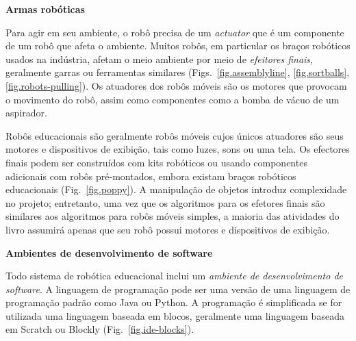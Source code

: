 
\smallskip

\noindent\textbf{Armas robóticas}

Para agir em seu ambiente, o robô precisa de um \emph{actuator} que é um componente de um robô que afeta o ambiente. Muitos robôs, em particular os braços robóticos usados na indústria, afetam o meio ambiente por meio de \emph{efeitores finais}, geralmente garras ou ferramentas similares (Figs.~\ref{fig.assemblyline}, \ref{fig.sortballs}, \ref{fig.robots-pulling}). Os atuadores dos robôs móveis são os motores que provocam o movimento do robô, assim como componentes como a bomba de vácuo de um aspirador.

Robôs educacionais são geralmente robôs móveis cujos únicos atuadores são seus motores e dispositivos de exibição, tais como luzes, sons ou uma tela. Os efectores finais podem ser construídos com kits robóticos ou usando componentes adicionais com robôs pré-montados, embora existam braços robóticos educacionais (Fig.~\ref{fig.poppy}). A manipulação de objetos introduz complexidade no projeto; entretanto, uma vez que os algoritmos para os efetores finais são similares aos algoritmos para robôs móveis simples, a maioria das atividades do livro assumirá apenas que seu robô possui motores e dispositivos de exibição.

\smallskip

\noindent\textbf{Ambientes de desenvolvimento de software}

Todo sistema de robótica educacional inclui um \emph{ambiente de desenvolvimento de software}. A linguagem de programação pode ser uma versão de uma linguagem de programação padrão como Java ou Python. A programação é simplificada se for utilizada uma linguagem baseada em blocos, geralmente uma linguagem baseada em Scratch ou Blockly (Fig.~\ref{fig.ide-blocks}).

